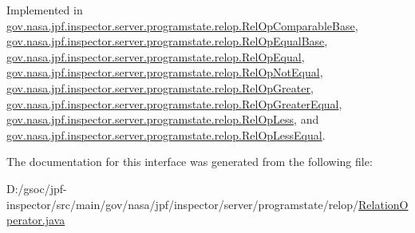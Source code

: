 Implemented in \hyperlink{classgov_1_1nasa_1_1jpf_1_1inspector_1_1server_1_1programstate_1_1relop_1_1_rel_op_comparable_base_a6c344f92ac28aeca1c6f1e1840fed335}{gov.\+nasa.\+jpf.\+inspector.\+server.\+programstate.\+relop.\+Rel\+Op\+Comparable\+Base}, \hyperlink{classgov_1_1nasa_1_1jpf_1_1inspector_1_1server_1_1programstate_1_1relop_1_1_rel_op_equal_base_a3817f1f5238378f4f50a1294ea2346ac}{gov.\+nasa.\+jpf.\+inspector.\+server.\+programstate.\+relop.\+Rel\+Op\+Equal\+Base}, \hyperlink{classgov_1_1nasa_1_1jpf_1_1inspector_1_1server_1_1programstate_1_1relop_1_1_rel_op_equal_ac5e8ce077e9cc83f7f75b8691bde25ae}{gov.\+nasa.\+jpf.\+inspector.\+server.\+programstate.\+relop.\+Rel\+Op\+Equal}, \hyperlink{classgov_1_1nasa_1_1jpf_1_1inspector_1_1server_1_1programstate_1_1relop_1_1_rel_op_not_equal_afbc268b8759659de23f54b045df71311}{gov.\+nasa.\+jpf.\+inspector.\+server.\+programstate.\+relop.\+Rel\+Op\+Not\+Equal}, \hyperlink{classgov_1_1nasa_1_1jpf_1_1inspector_1_1server_1_1programstate_1_1relop_1_1_rel_op_greater_ac8adcf1b8e8e67ffc5540c3fdce1bf4d}{gov.\+nasa.\+jpf.\+inspector.\+server.\+programstate.\+relop.\+Rel\+Op\+Greater}, \hyperlink{classgov_1_1nasa_1_1jpf_1_1inspector_1_1server_1_1programstate_1_1relop_1_1_rel_op_greater_equal_adb7862be25f7ca3f1784605adb77ef9f}{gov.\+nasa.\+jpf.\+inspector.\+server.\+programstate.\+relop.\+Rel\+Op\+Greater\+Equal}, \hyperlink{classgov_1_1nasa_1_1jpf_1_1inspector_1_1server_1_1programstate_1_1relop_1_1_rel_op_less_a355aedb19cdad948cd19e1a502faf317}{gov.\+nasa.\+jpf.\+inspector.\+server.\+programstate.\+relop.\+Rel\+Op\+Less}, and \hyperlink{classgov_1_1nasa_1_1jpf_1_1inspector_1_1server_1_1programstate_1_1relop_1_1_rel_op_less_equal_a3535df54e4766b48d5d15a330745be2c}{gov.\+nasa.\+jpf.\+inspector.\+server.\+programstate.\+relop.\+Rel\+Op\+Less\+Equal}.



The documentation for this interface was generated from the following file\+:\begin{DoxyCompactItemize}
\item 
D\+:/gsoc/jpf-\/inspector/src/main/gov/nasa/jpf/inspector/server/programstate/relop/\hyperlink{_relation_operator_8java}{Relation\+Operator.\+java}\end{DoxyCompactItemize}
